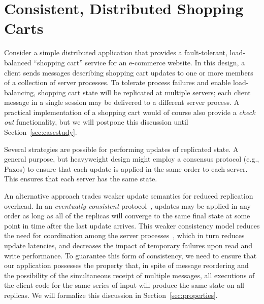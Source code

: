 \section{Consistent, Distributed Shopping Carts}
\label{sec:motivation}

Consider a simple distributed application that provides a fault-tolerant, load-balanced
``shopping cart'' service for an e-commerce website. In this design, a client
sends messages describing shopping cart updates to one or more members of a collection of server
processes. To tolerate process failures and enable load-balancing, shopping cart state will be replicated
at multiple servers; each client message in a single session may be delivered to a different server process.  A practical implementation of a shopping cart would of course also
provide a {\em check out} functionality, but we will postpone this discussion until
Section~\ref{sec:casestudy}.


Several strategies are possible for performing updates of replicated state. A
general purpose, but heavyweight design might employ a consensus protocol (e.g., Paxos\cite{part-time})
to ensure that each update is applied in the same order to each server. This
ensures that each server has the same state.

An alternative approach trades weaker update semantics for reduced
replication overhead.  In an {\em eventually consistent}
protocol~\cite{quicksand,beyond}, updates may be applied in any order
as long as all of the replicas will converge to the
same final state at some point in time after the last update arrives.
This weaker consistency model reduces the need for coordination among
the server processes~\cite{dynamo}, which in turn reduces update
latencies, and decreases the impact of temporary failures upon read and
write performance.  To guarantee this form of consistency, we need to ensure that our application possesses the 
property that, in spite of message reordering and the possibility of the simultaneous
receipt of multiple messages, all executions of the client code for the same series of
input will produce the same state on all replicas.  We will formalize this discussion in
Section~\ref{sec:properties}.



